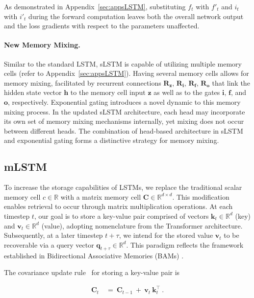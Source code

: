 As demonstrated in Appendix~\ref{sec:appsLSTM}, substituting $f_t$ with $f'_t$ and $i_t$ with $i'_t$ during the forward computation leaves both the overall network output and the loss gradients with respect to the parameters unaffected.

\paragraph{New Memory Mixing.} Similar to the standard LSTM, sLSTM is capable of utilizing multiple memory cells (refer to Appendix~\ref{sec:appsLSTM}). Having several memory cells allows for memory mixing, facilitated by recurrent connections $\mathbf{R}_{\mathbf{z}}$, $\mathbf{R}_{\mathbf{i}}$, $\mathbf{R}_{\mathbf{f}}$, $\mathbf{R}_{\mathbf{o}}$ that link the hidden state vector $\mathbf{h}$ to the memory cell input $\mathbf{z}$ as well as to the gates $\mathbf{i}$, $\mathbf{f}$, and $\mathbf{o}$, respectively. Exponential gating introduces a novel dynamic to this memory mixing process. In the updated sLSTM architecture, each head may incorporate its own set of memory mixing mechanisms internally, yet mixing does not occur between different heads. The combination of head-based architecture in sLSTM and exponential gating forms a distinctive strategy for memory mixing.

\subsection{mLSTM}
\label{sec:mLSTM}

To increase the storage capabilities of LSTMs, we replace the traditional scalar memory cell $c \in \mathbb{R}$ with a matrix memory cell $\mathbf{C} \in \mathbb{R}^{d \times d}$. This modification enables retrieval to occur through matrix multiplication operations. At each timestep $t$, our goal is to store a key-value pair comprised of vectors $\mathbf{k}_t \in \mathbb{R}^d$ (key) and $\mathbf{v}_t \in \mathbb{R}^d$ (value), adopting nomenclature from the Transformer architecture. Subsequently, at a later timestep $t + \tau$, we intend for the stored value $\mathbf{v}_t$ to be recoverable via a query vector $\mathbf{q}_{t+\tau} \in \mathbb{R}^d$. This paradigm reflects the framework established in Bidirectional Associative Memories (BAMs) \citep{Kohonen:72,Anderson:72,Nakano:72,Anderson:77}.

The covariance update rule~\citep{Sejnowski:77,Dayan:91} for storing a key-value pair is

\begin{align}
\mathbf{C}_t \ &= \ \mathbf{C}_{t-1} \ + \ \mathbf{v}_{t} \ \mathbf{k}_t^\top \ .
\end{align}

